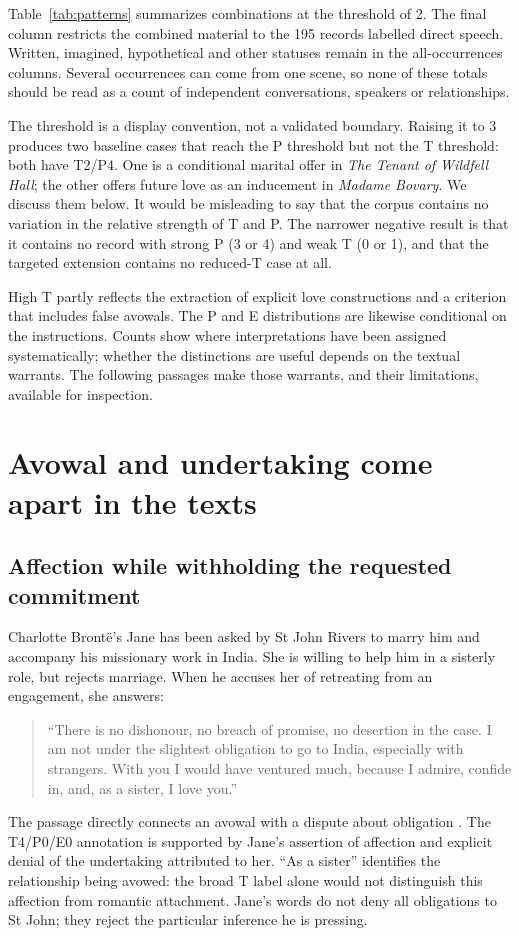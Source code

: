 \documentclass[11pt,a4paper]{article}
\begin{document}
Table~\ref{tab:patterns} summarizes combinations at the threshold of 2. The final column restricts the combined material to the 195 records labelled direct speech. Written, imagined, hypothetical and other statuses remain in the all-occurrences columns. Several occurrences can come from one scene, so none of these totals should be read as a count of independent conversations, speakers or relationships.

The threshold is a display convention, not a validated boundary. Raising it to 3 produces two baseline cases that reach the P threshold but not the T threshold: both have T2/P4. One is a conditional marital offer in \emph{The Tenant of Wildfell Hall}; the other offers future love as an inducement in \emph{Madame Bovary}. We discuss them below. It would be misleading to say that the corpus contains no variation in the relative strength of T and P. The narrower negative result is that it contains no record with strong P (3 or 4) and weak T (0 or 1), and that the targeted extension contains no reduced-T case at all.

High T partly reflects the extraction of explicit love constructions and a criterion that includes false avowals. The P and E distributions are likewise conditional on the instructions. Counts show where interpretations have been assigned systematically; whether the distinctions are useful depends on the textual warrants. The following passages make those warrants, and their limitations, available for inspection.

\section{Avowal and undertaking come apart in the texts}

\subsection{Affection while withholding the requested commitment}

Charlotte Bront\"e's Jane has been asked by St John Rivers to marry him and accompany his missionary work in India. She is willing to help him in a sisterly role, but rejects marriage. When he accuses her of retreating from an engagement, she answers:
\begin{quote}
“There is no dishonour, no breach of promise, no desertion in the case. I am not under the slightest obligation to go to India, especially with strangers. With you I would have ventured much, because I admire, confide in, and, as a sister, I love you.”
\end{quote}
The passage directly connects an avowal with a dispute about obligation \citep[chap.~XXXV]{bronteJaneEyre}. The T4/P0/E0 annotation is supported by Jane's assertion of affection and explicit denial of the undertaking attributed to her. “As a sister” identifies the relationship being avowed: the broad T label alone would not distinguish this affection from romantic attachment. Jane's words do not deny all obligations to St John; they reject the particular inference he is pressing.
\end{document}
